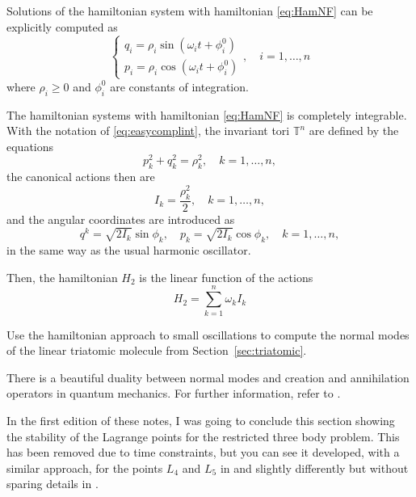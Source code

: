 \documentclass[english,fontsize=11pt,paper=a5,oneside]{scrbook}
\theoremstyle{definition}
\newenvironment{remark}
  {\pushQED{\qed}\renewcommand{\qedsymbol}{$\lozenge$}\remarkx}
  {\popQED\endremarkx}
\newenvironment{exercise}
  {\pushQED{\qed}\renewcommand{\qedsymbol}{$\maltese$}\exercisex}
  {\popQED\endexercisex}
\begin{document}
Solutions of the hamiltonian system with hamiltonian \eqref{eq:HamNF} can be explicitly computed as
\begin{equation}\label{eq:easycomplint}
    \left\lbrace
    \begin{aligned}
        q_i = \rho_i \sin(\omega_it +\phi_i^0) \\
        p_i = \rho_i \cos(\omega_it +\phi_i^0)
    \end{aligned}
    \right .,\quad i=1,\ldots,n
\end{equation}
where $\rho_i\geq0$ and $\phi_i^0$ are constants of integration.

\begin{remark}
    The hamiltonian systems with hamiltonian \eqref{eq:HamNF} is completely integrable.
    With the notation of \eqref{eq:easycomplint}, the invariant tori $\mathbb{T}^n$ are defined by the equations
    \begin{equation}
        p_k^2 + q_k^2 = \rho_k^2, \quad k=1,\ldots,n,
    \end{equation}
    the canonical actions then are
    \begin{equation}
        I_k = \frac{\rho_k^2}2, \quad k=1,\ldots,n,
    \end{equation}
    and the angular coordinates are introduced as
    \begin{equation}
        q^k = \sqrt{2I_k} \sin \phi_k, \quad p_k = \sqrt{2I_k} \cos \phi_k, \quad k=1,\ldots,n,
    \end{equation}
    in the same way as the usual harmonic oscillator.

    Then, the hamiltonian $H_2$ is the linear function of the actions
    \begin{equation}
        H_2 = \sum_{k=1}^n \omega_k I_k
    \end{equation}
\end{remark}

\begin{exercise}[The linear triatomic molecule]
    Use the hamiltonian approach to small oscillations to compute the normal modes of the linear triatomic molecule from Section~\ref{sec:triatomic}.
\end{exercise}

There is a beautiful duality between normal modes and creation and annihilation operators in quantum mechanics. For further information, refer to \cite[Chapter 2.10]{book:lowenstein}.

In the first edition of these notes, I was going to conclude this section showing the stability of the Lagrange points for the restricted three body problem.
This has been removed due to time constraints, but you can see it developed, with a similar approach, for the points $L_4$ and $L_5$ in \cite[Chapter 2.10]{book:lowenstein} and slightly differently but without sparing details in \cite{book:arnoldcelestial,book:celletti}.
\end{document}
